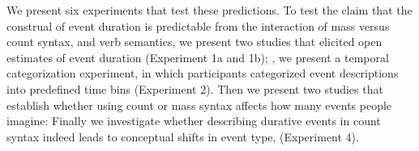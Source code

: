 \documentclass[review,12pt,authoryear]{elsarticle}
\begin{document}
We present six experiments that test these predictions. To test the claim that the construal of event duration is predictable from the interaction of mass versus count syntax, and verb semantics, we present two studies that elicited open estimates of event duration (Experiment 1a and 1b); , we  present a temporal categorization experiment, in which participants categorized event descriptions into predefined time bins (Experiment 2). Then we present two studies that establish whether using count or mass syntax affects how many events people imagine:  Finally we investigate whether describing durative events in count syntax indeed leads to conceptual shifts in event type,  (Experiment 4).
\end{document}
